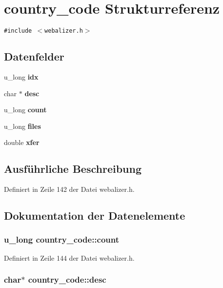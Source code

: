 \section{country\_\-code Strukturreferenz}
\label{structcountry__code}
{\tt \#include $<$webalizer.h$>$}

\subsection*{Datenfelder}
\begin{CompactItemize}
\item 
u\_\-long {\bf idx}
\item 
char $\ast$ {\bf desc}
\item 
u\_\-long {\bf count}
\item 
u\_\-long {\bf files}
\item 
double {\bf xfer}
\end{CompactItemize}


\subsection{Ausf\"{u}hrliche Beschreibung}




Definiert in Zeile 142 der Datei webalizer.h.

\subsection{Dokumentation der Datenelemente}
\subsubsection{\setlength{\rightskip}{0pt plus 5cm}u\_\-long {\bf country\_\-code::count}}\label{structcountry__code_1998a168a8ea9025323f7ca7080b7ad7}




Definiert in Zeile 144 der Datei webalizer.h.
\subsubsection{\setlength{\rightskip}{0pt plus 5cm}char$\ast$ {\bf country\_\-code::desc}}\label{structcountry__code_835c53390df57142797eae431d0d7a8b}




